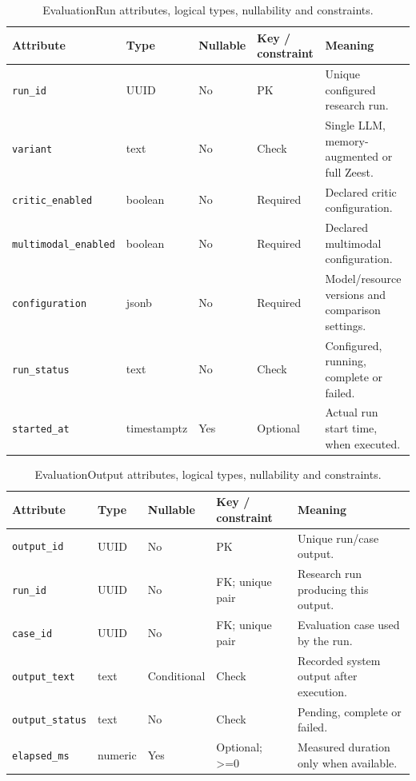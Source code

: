 \begin{table}[htbp]
\setlength{\tabcolsep}{5pt}
\centering
\small
\caption{EvaluationRun attributes, logical types, nullability and constraints.}
\label{tab:kashaf:dict-evaluationrun}
\begin{tabular}{|p{}|p{}|p{}|p{}|p{}|}
\hline
Attribute & Type & Nullable & Key / constraint & Meaning \\ \hline
\texttt{run\_id} & UUID & No & PK & Unique configured research run. \\ \hline
\texttt{variant} & text & No & Check & Single LLM, memory-augmented or full Zeest. \\ \hline
\texttt{critic\_enabled} & boolean & No & Required & Declared critic configuration. \\ \hline
\texttt{multimodal\_enabled} & boolean & No & Required & Declared multimodal configuration. \\ \hline
\texttt{configuration} & jsonb & No & Required & Model/resource versions and comparison settings. \\ \hline
\texttt{run\_status} & text & No & Check & Configured, running, complete or failed. \\ \hline
\texttt{started\_at} & timestamptz & Yes & Optional & Actual run start time, when executed. \\ \hline
\end{tabular}
\end{table}

\begin{table}[htbp]
\setlength{\tabcolsep}{5pt}
\centering
\small
\caption{EvaluationOutput attributes, logical types, nullability and constraints.}
\label{tab:kashaf:dict-evaluationoutput}
\begin{tabular}{|p{}|p{}|p{}|p{}|p{}|}
\hline
Attribute & Type & Nullable & Key / constraint & Meaning \\ \hline
\texttt{output\_id} & UUID & No & PK & Unique run/case output. \\ \hline
\texttt{run\_id} & UUID & No & FK; unique pair & Research run producing this output. \\ \hline
\texttt{case\_id} & UUID & No & FK; unique pair & Evaluation case used by the run. \\ \hline
\texttt{output\_text} & text & Conditional & Check & Recorded system output after execution. \\ \hline
\texttt{output\_status} & text & No & Check & Pending, complete or failed. \\ \hline
\texttt{elapsed\_ms} & numeric & Yes & Optional; >=0 & Measured duration only when available. \\ \hline
\end{tabular}
\end{table}

